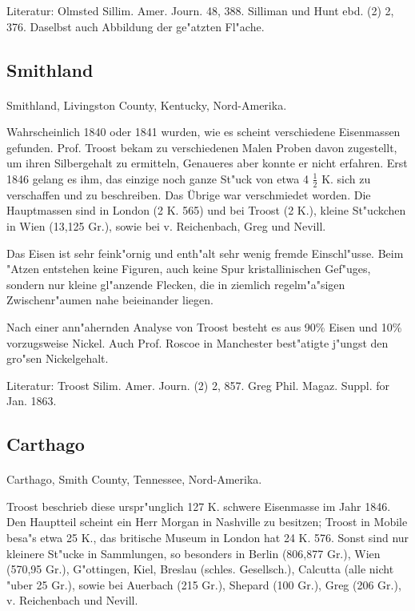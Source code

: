 \documentclass[a4paper, 11pt, oneside]{article}
\begin{document}
Literatur: Olmsted Sillim. Amer. Journ. 48, 388. Silliman und Hunt ebd. (2) 2, 376. Daselbst auch Abbildung der ge"atzten Fl"ache.

\subsection{Smithland}
\normalsize
\paragraph{}
Smithland, Livingston County, Kentucky, Nord-Amerika.

Wahrscheinlich 1840 oder 1841 wurden, wie es scheint verschiedene Eisenmassen gefunden. Prof. Troost bekam zu verschiedenen Malen Proben davon zugestellt, um ihren Silbergehalt zu ermitteln, Genaueres aber konnte er nicht erfahren. Erst 1846 gelang es ihm, das einzige noch ganze St"uck von etwa 4 $\frac{1}{2}$ K. sich zu verschaffen und zu beschreiben. Das Übrige war verschmiedet worden. Die Hauptmassen sind in London (2 K. 565) und bei Troost (2 K.), kleine St"uckchen in Wien (13,125 Gr.), sowie bei v. Reichenbach, Greg und Nevill.

Das Eisen ist sehr feink"ornig und enth"alt sehr wenig fremde Einschl"usse. Beim "Atzen entstehen keine Figuren, auch keine Spur kristallinischen Gef"uges, sondern nur kleine gl"anzende Flecken, die in ziemlich regelm"a"sigen Zwischenr"aumen nahe beieinander liegen.

Nach einer ann"ahernden Analyse von Troost besteht es aus 90\% Eisen und 10\% vorzugsweise Nickel. Auch Prof. Roscoe in Manchester best"atigte j"ungst den gro"sen Nickelgehalt.

Literatur: Troost Silim. Amer. Journ. (2) 2, 857. Greg Phil. Magaz. Suppl. for Jan. 1863.

\subsection{Carthago}
\normalsize
\paragraph{}
Carthago, Smith County, Tennessee, Nord-Amerika.

Troost beschrieb diese urspr"unglich 127 K. schwere Eisenmasse im Jahr 1846. Den Hauptteil scheint ein Herr Morgan in Nashville zu besitzen; Troost in Mobile besa"s etwa 25 K., das britische Museum in London hat 24 K. 576. Sonst sind nur kleinere St"ucke in Sammlungen, so besonders in Berlin (806,877 Gr.), Wien (570,95 Gr.), G"ottingen, Kiel, Breslau (schles. Gesellsch.), Calcutta (alle nicht "uber 25 Gr.), sowie bei Auerbach (215 Gr.), Shepard (100 Gr.), Greg (206 Gr.), v. Reichenbach und Nevill.
\end{document}
